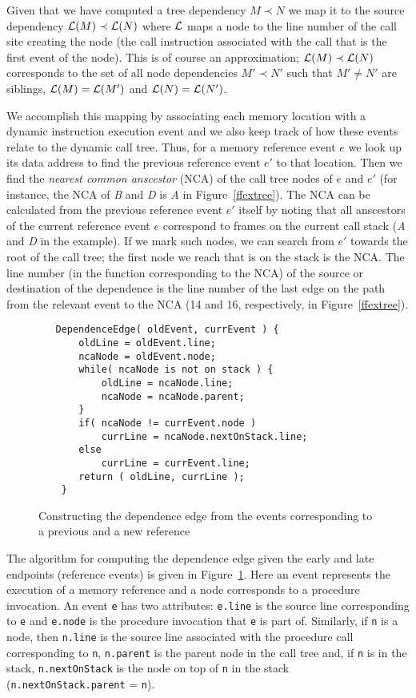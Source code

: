 \documentclass{acm_proc_article-sp}
\begin{document}
\newcommand{\li}{{\cal L}}
Given that we have computed a tree dependency $M \prec N$ we map it to
the source dependency $\li(M) \prec \li(N)$ where $\li$ maps a node to the
line number of the call site creating the node (the call instruction associated 
with the call that is the first event of the node). This is of course an
approximation; $\li(M) \prec \li(N)$ corresponds to the set of all node
dependencies $M' \prec N'$ such that $M' \not= N'$ are siblings, $\li(M)=\li(M')$
and $\li(N)=\li(N')$.


We accomplish this mapping by associating each memory location with a dynamic
instruction execution event and we also keep track of how these events 
relate to the dynamic call tree. Thus, for a memory reference event $e$ we 
look up its data address to find the previous reference event $e'$ to that 
location. Then we find the {\em nearest common anscestor} (NCA) of the call
tree nodes of $e$ and $e'$ (for instance, the NCA of {\it B} and {\it D} is
{\it A} in Figure~\ref{ffextree}). The NCA can be calculated from the previous
reference event $e'$ itself by noting that all anscestors of the current
reference event $e$ correspond to frames on the current call stack ({\it A} 
and {\it D} in the example). If we mark 
such nodes, we can search from $e'$ 
towards the root of the call tree; the first node we reach that is on the 
stack is the NCA.
The line number (in the function corresponding to the NCA) of the source or 
destination of the dependence is the line number of the last edge on the path 
from the relevant event to the NCA (14 and 16, respectively, in 
Figure~\ref{ffextree}).


\begin{figure}
\small
\hrulefill
\begin{verbatim}
   DependenceEdge( oldEvent, currEvent ) {
       oldLine = oldEvent.line;
       ncaNode = oldEvent.node;
       while( ncaNode is not on stack ) {
           oldLine = ncaNode.line;
           ncaNode = ncaNode.parent;
       }
       if( ncaNode != currEvent.node )
           currLine = ncaNode.nextOnStack.line;
       else
           currLine = currEvent.line;
       return ( oldLine, currLine );
    }
\end{verbatim}
\hrulefill
\caption{Constructing the dependence edge from the events corresponding
to a previous and a new reference}
\label{fdepedge}
\end{figure}    

The algorithm for computing the dependence edge given the early and late
endpoints (reference events) is given in Figure~\ref{fdepedge}. Here an 
event represents the execution of a memory reference and a node corresponds 
to a procedure invocation. An event {\tt e} has two attributes: {\tt e.line} 
is the source line corresponding to {\tt e} and {\tt e.node} is the procedure 
invocation that {\tt e} is part of. Similarly, if {\tt n} is a node, then 
{\tt n.line} is the source line associated with the procedure call 
corresponding to {\tt n}, {\tt n.parent} is the parent node in the call tree 
and, if {\tt n} is in the stack, {\tt n.nextOnStack} is the node on top of 
{\tt n} in the stack ({\tt n.nextOnStack.parent} = {\tt n}).
\end{document}
